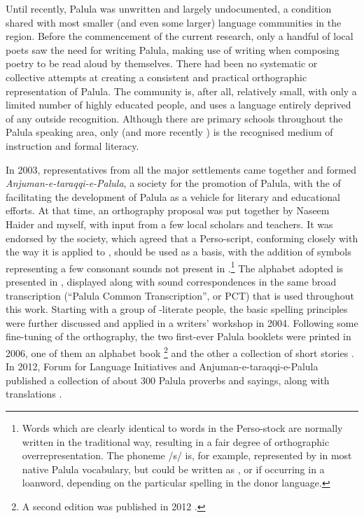 Until recently, Palula was unwritten and largely undocumented, a condition shared with most smaller (and even some larger) language communities in the region. Before the commencement of the current research, only a handful of local poets saw the need for writing Palula, making use of \iliUrdu writing when composing poetry to be read aloud by themselves. There had been no systematic or collective attempts at creating a consistent and practical orthographic representation of Palula. The community is, after all, relatively small, with only a limited number of highly educated people, and uses a language entirely deprived of any outside recognition. Although there are primary schools throughout the Palula speaking area, only \iliUrdu (and more recently \iliEnglish) is the recognised medium of instruction and formal literacy.


In 2003, representatives from all the major settlements came together and formed \textit{Anjuman-e-taraqqi-e-Palula}, a society for the promotion of Palula, with the  of facilitating the development of Palula as a vehicle for literary and educational efforts. At that time, an orthography proposal was put together by Naseem Haider and myself, with input from a few local scholars and teachers. It was endorsed by the society, which agreed that a Perso-\iliArabic script, conforming closely with the way it is applied to \iliUrdu, should be used as a basis, with the addition of symbols representing a few consonant sounds not present in \iliUrdu.\footnote{Words which are clearly identical to words in the Perso-\iliArabic stock are normally written in the traditional way, resulting in a fair degree of orthographic overrepresentation. The phoneme /s/ is, for example, represented by {\large{}} in most native Palula vocabulary, but could be written as {\large{}}, {\large{}} or {\large{}} if occurring in a loanword, depending on the particular spelling in the donor language.} The alphabet adopted is presented in , displayed along with sound correspondences in the same broad transcription (``Palula Common Transcription'', or PCT) that is used throughout this work. Starting with a group of \iliUrdu-literate people, the basic spelling principles were further discussed and applied in a writers’ workshop in 2004. Following some fine-tuning of the orthography, the two first-ever Palula booklets were printed in 2006, one of them an alphabet book \citep{haider2006a}\footnote{A second edition was published in 2012 \citep{haider2012a}.} and the other a collection of short stories \citep{haider2006b}. In 2012, Forum for Language Initiatives and Anjuman-e-taraqqi-e-Palula published a collection of about 300 Palula proverbs and sayings, along with \iliUrdu translations \citep{haider2012b}.


